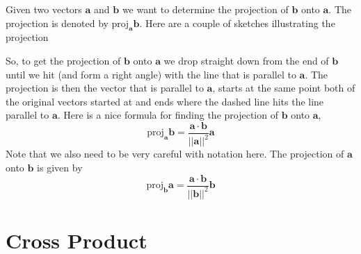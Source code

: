 \documentclass[10pt,reqno]{book}
\theoremstyle{definition}
\renewcommand{\vec}[1]{\mathbf{#1}}
\begin{document}
	Given two vectors $\vec{a}$ and $\vec{b}$ we want to determine the projection of $\vec{b}$ onto $\vec{a}$. The projection is denoted by $ \text{proj}_{\vec{a}}\vec{b}$. Here are a couple of sketches illustrating the projection
	\begin{center}
		\hspace{1cm}	
	\end{center}
	So, to get the projection of $\vec{b}$ onto $\vec{a}$ we drop straight down from the end of $\vec{b}$ until we hit (and form a right angle) with the line that is parallel to $\vec{a}$. The projection is then the vector that is parallel to $\vec{a}$, starts at the same point both of the original vectors started at and ends where the dashed line hits the line parallel to $\vec{a}$. Here is a nice formula for finding the projection of $\vec{b}$ onto $\vec{a}$,
	\[ \text{proj}_{\vec{a}}\vec{b} = \frac{\vec{a} \cdot \vec{b}}{||\vec{a}||^2}\vec{a} \]
	Note that we also need to be very careful with notation here. The projection of $\vec{a}$ onto $\vec{b}$ is given by
	\[ \text{proj}_{\vec{b}}\vec{a} = \frac{\vec{a} \cdot \vec{b}}{||\vec{b}||^2}\vec{b} \]

	\section{Cross Product}
\end{document}

